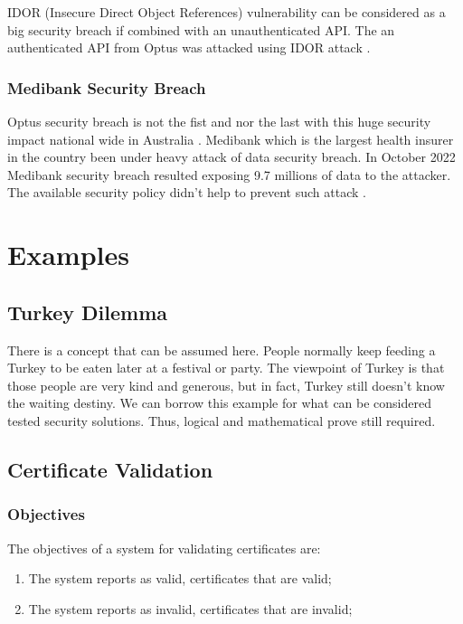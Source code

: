 \documentclass[journal]{IEEEtran}
\begin{document}
IDOR (Insecure Direct Object References) vulnerability can be considered as a big security
breach if combined with an unauthenticated API. The an authenticated API from Optus was attacked
using IDOR attack \cite{james2022}.

\subsubsection{Medibank Security Breach}
Optus security breach is not the fist and nor the last with this huge security impact national
wide in Australia \cite{medibank2022}\cite{maurice2023}. Medibank which is the largest health
insurer in the country been under heavy attack of data security breach. In October 2022 Medibank
security breach resulted exposing 9.7 millions of data to the attacker. The available security policy
didn't help to prevent such attack \cite{biddle2022p}.

\section{Examples}

\subsection*{Turkey Dilemma}
There is a concept that can be assumed here. People normally keep feeding a Turkey to be eaten later at
a festival or party. The viewpoint of Turkey is that those people are very kind and generous, but in fact,
Turkey still doesn't know the waiting destiny. We can borrow this example for what can be considered tested
security solutions. Thus, logical and mathematical prove still required.

\subsection{Certificate Validation}

\subsubsection{Objectives}

The objectives of a system for validating certificates are:
\begin{enumerate}[CO-1]
  \item\label{validates1} The system reports as valid, certificates that are valid;
  \item\label{validates2} The system reports as invalid, certificates that are invalid;
\end{enumerate}
\end{document}
